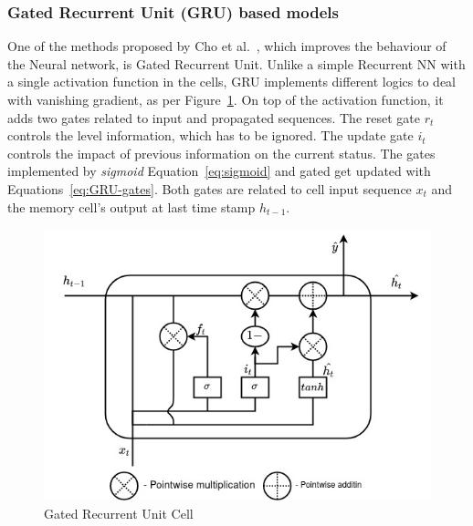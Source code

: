 %
\subsubsection{Gated Recurrent Unit (GRU) based models} \label{subsub:gru}
One of the methods proposed by Cho et al.~\cite{GRU_cho_properties_2014}, which improves the behaviour of the Neural network, is Gated Recurrent Unit.
Unlike a simple Recurrent NN with a single activation function in the cells, GRU implements different logics to deal with vanishing gradient, as per \mbox{Figure~\ref{fig:GRU-cell}}.
On top of the activation function, it adds two gates related to input and propagated sequences.
The reset gate $r_t$ controls the level information, which has to be ignored.
The update gate $i_t$ controls the impact of previous information on the current status.
The gates implemented by \textit{sigmoid} \mbox{Equation~\ref{eq:sigmoid}} and gated get updated with \mbox{Equations~\ref{eq:GRU-gates}}.
Both gates are related to cell input sequence $x_t$ and the memory cell's output at last time stamp $h_{t-1}$.
\begin{figure}[ht]%
    \centering
    \includegraphics[width=\linewidth]{II_Body/GRU/images/GRU.jpg}
    \caption{Gated Recurrent Unit Cell}
    \label{fig:GRU-cell}
\end{figure}
